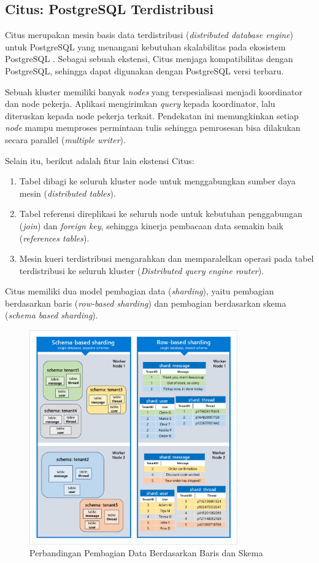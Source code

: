 \subsection{Citus: PostgreSQL Terdistribusi}

Citus merupakan mesin basis data terdistribusi (\textit{distributed database engine}) untuk PostgreSQL yang menangani kebutuhan skalabilitas pada ekosistem PostgreSQL \parencite{citus}. Sebagai sebuah ekstensi, Citus menjaga kompatibilitas dengan PostgreSQL, sehingga dapat digunakan dengan PostgreSQL versi terbaru.

Sebuah kluster memiliki banyak \textit{nodes} yang terspesialisasi menjadi koordinator dan node pekerja. Aplikasi mengirimkan \textit{query} kepada koordinator, lalu diteruskan kepada node pekerja terkait. Pendekatan ini memungkinkan setiap \textit{node} mampu memproses permintaan tulis sehingga pemrosesan bisa dilakukan secara parallel (\textit{multiple writer}).

Selain itu, berikut adalah fitur lain ekstensi Citus:

\begin{enumerate}
    \item Tabel dibagi ke seluruh kluster node untuk menggabungkan sumber daya mesin (\textit{distributed tables}).
    \item Tabel referensi direplikasi ke seluruh node untuk kebutuhan penggabungan (\textit{join}) dan \textit{foreign key}, sehingga kinerja pembacaan data semakin baik (\textit{references tables}).
    \item Mesin kueri terdistribusi mengarahkan dan memparalelkan operasi pada tabel terdistribusi ke seluruh kluster (\textit{Distributed query engine router}).
\end{enumerate}

Citus memiliki dua model pembagian data (\textit{sharding}), yaitu pembagian berdasarkan baris (\textit{row-based sharding}) dan pembagian berdasarkan skema (\textit{schema based sharding}).

\begin{figure}[htbp]
    \centering
    \includegraphics[width=0.8\textwidth]{resources/chapter-2/row-vs-schema-sharding.png}
    \caption{Perbandingan Pembagian Data Berdasarkan Baris dan Skema \parencite{schemaBasedSharding}}
    \label{fig:row-vs-schema-sharding}
\end{figure}

